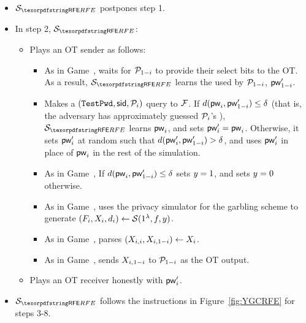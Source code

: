 \begin{games}
\begin{itemize}
\item
$\SimYGCRFE$ postpones step 1.
\item 
In step 2, $\SimYGCRFE$:
\begin{itemize}
\item Plays an OT sender as follows:
\begin{itemize}
\item As in Game~, waits for $\mathcal{P}_{1-i}$ to provide their select bits to the OT.
As a result, $\SimYGCRFE$ learns the \password used by $\mathcal{P}_{1-i}$, $\mathsf{pw}_{1-i}'$.
\item Makes a $(\texttt{TestPwd}, \mathsf{sid}, \mathcal{P}_i)$ query to $\mathcal{F}$. 
If $d(\mathsf{pw}_{i}, \mathsf{pw}_{1-i}') \leq \delta$ (that is, the adversary has approximately guessed $\mathcal{P}_{i}$'s \password), $\SimYGCRFE$ learns $\mathsf{pw}_{i}$, and sets $\mathsf{pw}_{i}' = \mathsf{pw}_{i}$.
Otherwise, it sets $\mathsf{pw}_{i}'$ at random such that $d(\mathsf{pw}_{i}', \mathsf{pw}_{1-i}') > \delta$, and uses $\mathsf{pw}_{i}'$ in place of $\mathsf{pw}_{i}$ in the rest of the simulation.
\item As in Game~, If $d(\mathsf{pw}_{i}, \mathsf{pw}_{1-i}') \leq \delta$ sets $y = 1$, and sets $y = 0$ otherwise.
\item As in Game~, uses the privacy simulator for the garbling scheme to generate $(F_{i}, X_{i}, d_{i}) \gets \mathcal{S}(1^{\lambda}, f, y)$.
\item As in Game~, parses $(X_{i,i}, X_{i,1-i}) \gets X_{i}$.
\item As in Game~, sends $X_{i,1-i}$ to $\mathcal{P}_{1-i}$ as the OT output.
\end{itemize}
\item Plays an OT receiver honestly with $\mathsf{pw}_{i}'$.
\end{itemize}
\item 
$\SimYGCRFE$ follows the instructions in Figure~\ref{fig:YGCRFE} for steps 3-8.
\end{itemize}



\end{games}
